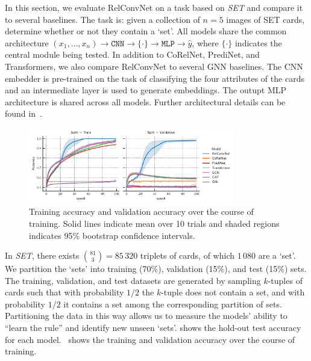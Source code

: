In this section, we evaluate RelConvNet on a task based on \textit{SET} and compare it to several baselines. The task is: given a collection of $n=5$ images of SET cards, determine whether or not they contain a `set'. All models share the common architecture $(x_1, \ldots, x_n) \to \texttt{CNN} \to \{ \cdot \} \to \texttt{MLP} \to \hat{y}$, where $\{\cdot\}$ indicates the central module being tested. In addition to CoRelNet, PrediNet, and Transformers, we also compare RelConvNet to several GNN baselines. The CNN embedder is pre-trained on the task of classifying the four attributes of the cards and an intermediate layer is used to generate embeddings. The outupt MLP architecture is shared across all models.
Further architectural details can be found in~. 

\begin{figure}[!ht]
    \centering
    \includegraphics[width=0.8\textwidth]{figs/experiments/contains_set_training_curves.pdf}
    \vskip-10pt
    \caption{Training accuracy and validation accuracy over the course of training. Solid lines indicate mean over 10 trials and shaded regions indicates 95\% bootstrap confidence intervals.}\label{fig:contains_set_training_curves}
    \vskip-12pt
\end{figure}

In \textit{SET}, there exists $\binom{81}{3} = 85\,320$ triplets of cards, of which $1\,080$ are a `set'. We partition the `sets' into training (70\%), validation (15\%), and test (15\%) sets. The training, validation, and test datasets are generated by sampling $k$-tuples of cards such that with probability $1/2$ the $k$-tuple does not contain a set, and with probability $1/2$ it contains a set among the corresponding partition of sets. Partitioning the data in this way allows us to measure the models' ability to ``learn the rule'' and identify new unseen `sets'.
 shows the hold-out test accuracy for each model.~ shows the training and validation accuracy over the course of training.

